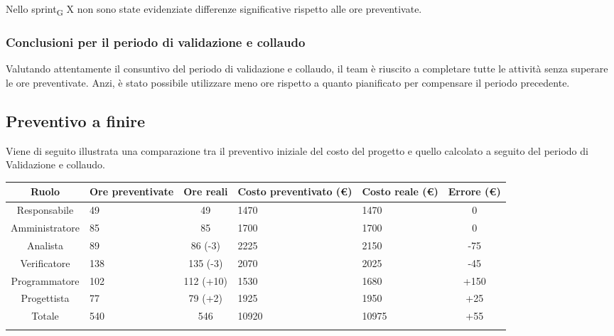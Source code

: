 Nello sprint\textsubscript{G} X non sono state evidenziate differenze significative rispetto alle ore preventivate.

\subsubsection{Conclusioni per il periodo di validazione e collaudo}

Valutando attentamente il consuntivo del periodo di validazione e collaudo, il team è riuscito a completare tutte le attività senza superare le ore preventivate. 
Anzi, è stato possibile utilizzare meno ore rispetto a quanto pianificato per compensare il periodo precedente. 






















\newpage

\subsection{Preventivo a finire}
Viene di seguito illustrata una comparazione tra il preventivo iniziale del costo del progetto e quello calcolato a seguito del periodo di Validazione e collaudo.
\setlength\extrarowheight{5pt}
\begin{tabularx}{\textwidth}{|c|XcXX|c|}
	\hline
	\rowcolor{white}
	\textbf{Ruolo} & \textbf{Ore preventivate} & \textbf{Ore reali} & \textbf{Costo preventivato (€)} & \textbf{Costo reale (€)} & \textbf{Errore (€)} \\
	\hline
	Responsabile &49& 49 &1470&1470& 0 \\ 
	Amministratore &85& 85 &1700&1700& 0\\
	Analista &89&86 (-3)&2225&2150& -75 \\
	Verificatore &138&135 (-3)&2070&2025& -45 \\
	Programmatore &102&112 (+10)&1530&1680& +150 \\
	Progettista &77&79 (+2)&1925&1950& +25 \\
	\hline
	Totale &540&546&10920&10975&+55\\
	\hline
	\rowcolor{white}
	\caption{Preventivo a finire di ore e costi per ruolo}
\end{tabularx}
